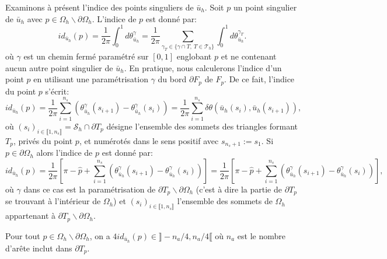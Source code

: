 Examinons à présent l'indice des points singuliers de $\bar{u}_h$. Soit $p$ un point singulier de $\bar{u}_h$ avec $p\in\Omega_h\backslash\partial\Omega_h$. L'indice de $p$ est donné par:
$$
id_{\bar{u}_h}(p)=\frac{1}{2\pi}\int_0^1 d\theta^\gamma_{\bar{u}_h}=\frac{1}{2\pi}\sum_{\gamma_T\in\{\gamma\cap T,~T\in\mathcal{T}_h\}}\int_0^1 d\theta^{\gamma_T}_{\bar{u}_h}.
$$
où $\gamma$ est un chemin fermé paramétré sur $[0, 1]$ englobant $p$ et ne contenant aucun autre point singulier de $\bar{u}_h$. En pratique, nous calculerons l'indice d'un point $p$ en utilisant une paramétrisation $\gamma$ du bord $\partial F_p$ de $F_p$. De ce fait, l'indice du point $p$ s'écrit:
\begin{equation}
    \label{eqn:ind_int}
    id_{\bar{u}_h}(p)=\displaystyle\frac{1}{2\pi}\displaystyle\sum_{i=1}^{n_s}\left(\theta^\gamma_{\bar{u}_h}(s_{i+1})-\theta^\gamma_{\bar{u}_h}(s_i)\right)=\displaystyle\frac{1}{2\pi}\sum_{i=1}^{n_s}\delta\theta(\bar{u}_h(s_i),\bar{u}_h(s_{i+1})),
\end{equation}
où $(s_i)_{i\in\llbracket 1, n_s\rrbracket}=\mathcal{S}_h\cap\partial T_p$ désigne l'ensemble des sommets des triangles formant $T_p$, privés du point $p$, et numérotés dans le sens positif avec $s_{n_s+1}:=s_1$.
Si $p\in\partial\Omega_h$ alors l'indice de $p$ est donné par:
\begin{equation}
    \label{eqn:ind_bord}
    id_{\bar{u}_h}(p)=\displaystyle\frac{1}{2\pi}\left[\pi-\widehat{p}+\displaystyle\sum_{i=1}^{n_s}\left(\theta^\gamma_{\bar{u}_h}(s_{i+1})-\theta^\gamma_{\bar{u}_h}(s_i)\right)\right]=\displaystyle\frac{1}{2\pi}\left[\pi-\widehat{p}+\displaystyle\sum_{i=1}^{n_s}\left(\theta^\gamma_{\bar{u}_h}(s_{i+1})-\theta^\gamma_{\bar{u}_h}(s_i)\right)\right],
\end{equation}
où $\gamma$ dans ce cas est la paramétrisation de $\partial T_p\backslash\partial\Omega_h$ (c'est à dire la partie de $\partial T_p$ se trouvant à l'intérieur de $\Omega_h$) et $(s_i)_{i\in\llbracket 1, n_s\rrbracket}$ l'ensemble des sommets de $\Omega_h$ appartenant à $\partial T_p\backslash\partial\Omega_h$.

\begin{proposition}
    Pour tout $p\in\Omega_h\backslash\partial\Omega_h$, on a $4id_{\bar{u}_h}(p)\in\rrbracket -n_a/4, n_a/4\llbracket$ où $n_a$ est le nombre d'arête inclut dans $\partial T_p$.
\end{proposition}

